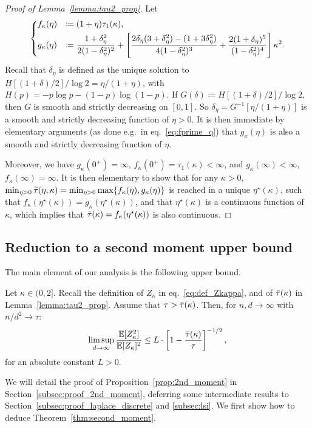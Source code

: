 \begin{proof}[Proof of Lemma~\ref{lemma:tau2_prop}]
Let 
\begin{equation*}
    \begin{dcases}
    f_\kappa(\eta) &\coloneqq (1+\eta) \tau_1(\kappa), \\
    g_\kappa(\eta) &\coloneq \frac{1+\delta_{\eta}^2}{2(1-\delta_{\eta}^2)^2}
      + \left[\frac{2 \delta_{\eta} (3+\delta_{\eta}^2) - (1+3 \delta_\eta^2)}{4(1-\delta_{\eta}^2)^3} + \frac{2(1+\delta_{\eta})^5}{(1-\delta_{\eta}^2)^4}\right] \kappa^2.
    \end{dcases}
\end{equation*}
Recall that $\delta_\eta$ is defined as the unique solution to $H[(1+\delta)/2]/\log 2 = \eta / (1+\eta)$, 
with $H(p) = -p \log p - (1-p) \log(1-p)$.
If $G(\delta) \coloneqq H[(1+\delta)/2]/\log 2$, then
$G$ is smooth and strictly decreasing on $[0,1]$. 
So $\delta_\eta = G^{-1}[\eta / (1+\eta)]$ is a smooth and strictly decreasing function of $\eta > 0$.
It is then immediate by elementary arguments (as done e.g.\ in eq.~\eqref{eq:fprime_q}) that 
$g_\kappa(\eta)$ is also a smooth and strictly decreasing function of $\eta$.

\myskip
Moreover, we have $g_\kappa(0^+) = \infty$, $f_\kappa(0^+) = \tau_1(\kappa) < \infty$, and $g_\kappa(\infty) < \infty$, $f_\kappa(\infty) = \infty$.
It is then elementary to show that for any $\kappa > 0$, $\min_{\eta > 0} {\widetilde{\tau}}(\eta, \kappa) = \min_{\eta > 0} \max\{f_\kappa(\eta), g_\kappa(\eta)\}$ 
is reached in a unique $\eta^\star(\kappa)$, such that $f_\kappa(\eta^\star(\kappa)) = g_\kappa(\eta^\star(\kappa))$, and that 
$\eta^\star(\kappa)$ is a continuous function of $\kappa$, which implies that ${\bar{\tau}}(\kappa) = f_\kappa(\eta^\star(\kappa))$ is also continuous.
\end{proof}

\subsection{Reduction to a second moment upper bound}\label{subsec:reduction_2nd_moment_ub}

The main element of our analysis is the following upper bound.
\begin{proposition}\label{prop:2nd_moment}
    Let $\kappa \in (0, 2]$. Recall the definition of $Z_\kappa$ in eq.~\eqref{eq:def_Zkappa}, and of ${\bar{\tau}}(\kappa)$ in Lemma~\ref{lemma:tau2_prop}.
    Assume that $\tau > {\bar{\tau}}(\kappa)$.
    Then, for $n, d \to \infty$ with $n/d^2 \to \tau$:
    \begin{equation*} 
        \limsup_{d \to \infty} \frac{\mathbb{E}[Z_\kappa^2]}{\mathbb{E}[Z_\kappa]^2} \leq L \cdot \left[1 - \frac{{\bar{\tau}}(\kappa)}{\tau}\right]^{-1/2},
    \end{equation*}
    for an absolute constant $L > 0$.
\end{proposition}
\noindent
We will detail the proof of Proposition~\ref{prop:2nd_moment} in Section~\ref{subsec:proof_2nd_moment}, deferring some intermediate results to Section~\ref{subsec:proof_laplace_discrete} and \ref{subsec:lsi}. 
We first show how to deduce Theorem~\ref{thm:second_moment}.

